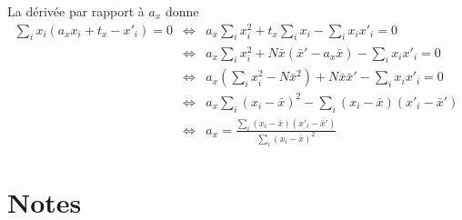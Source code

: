 La d\'eriv\'ee par rapport \`a $a_x$ donne
\begin{eqnarray*}
\sum_i x_i \left( a_x x_i + t_x - x'_i \right) = 0
& \Longleftrightarrow &
a_x \sum_i x_i^2 + t_x \sum_i x_i - \sum_i x_i x'_i = 0\\
& \Longleftrightarrow &
a_x \sum_i x_i^2 +
N \bar{x} \left( \bar{x}' - a_x \bar{x} \right) - \sum_i x_i x'_i = 0\\
& \Longleftrightarrow &
a_x \left( \sum_i x_i^2 - N \bar{x}^2 \right)
+ N \bar{x} \bar{x}' - \sum_i x_i x'_i = 0 \\
& \Longleftrightarrow &
a_x \sum_i \left( x_i - \bar{x} \right)^2  
 - \sum_i \left( x_i - \bar{x} \right)\left( x'_i - \bar{x}' \right) \\
& \Longleftrightarrow &
a_x = \frac{\sum_i \left( x_i - \bar{x} \right)\left( x'_i - \bar{x}' \right)}{\sum_i \left( x_i - \bar{x} \right)^2}
\end{eqnarray*}




\section{Notes}

